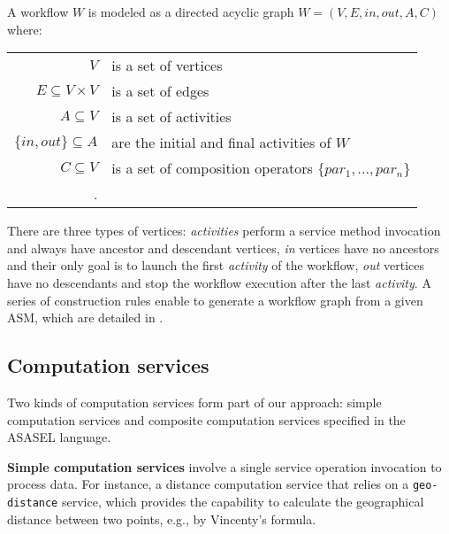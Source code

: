 A workflow $W$ is modeled as a directed acyclic graph $W=(V, E, in, out, A, C)$ where:
		\begin{center}
			\footnotesize
			\begin{tabular}{rp{7.5cm}}
				$V$                      & is a set of vertices \\
				$E \subseteq V \times V$ & is a set of edges \\
				$A \subseteq V$          & is a set of activities \\
				$\{in, out\} \subseteq A$     & are the initial and final activities of $W$\\
				$C \subseteq V$          & is a set of composition operators $\{par_1,...,par_n\}$\\.     
			\end{tabular}   
		\end{center}
There are three types of vertices: \textit{activities} perform a service method invocation and always have ancestor and descendant vertices, \textit{in} vertices have no ancestors and their only goal is to launch the first \textit{activity} of the workflow, \textit{out} vertices have no descendants and stop the workflow execution after the last \textit{activity}. A series of construction rules enable to generate a workflow graph from a given ASM, which are detailed in \cite{vcv}.

\subsection{Computation services}\label{subsec:computationServices}

Two kinds of computation services form part of our approach: simple computation services and composite computation services specified in the ASASEL language.


\textbf{Simple computation services}  involve a single service operation invocation to process data. For instance, a distance computation service that relies on a \texttt{geo-distance} service, which provides the capability to calculate the geographical distance between two points, e.g., by Vincenty's formula.

